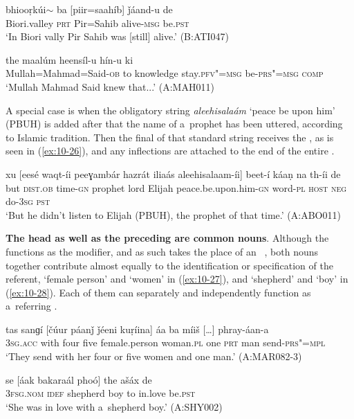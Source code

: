 \begin{exe}
\ex
\label{ex:10-24}
\gll bhiooṛkúi$\sim$ ba [piir=saahíb] ǰáand-u de \\
Biori.valley \textsc{prt} Pir=Sahib alive-\textsc{msg} be.\textsc{pst} \\
\glt `In Biori vally Pir Sahib was [still] alive.' (B:ATI047)

\ex
\label{ex:10-25}
\gll [mulaa=mhaamad=seed-á] the maalúm heensíl-u hín-u ki \\
Mullah=Mahmad=Said-\textsc{ob} to knowledge stay.\textsc{pfv"=msg} be-\textsc{prs"=msg} \textsc{comp} \\
\glt `Mullah Mahmad Said knew that...' (A:MAH011)
\end{exe}

A special case is when the obligatory string \textit{aleehisalaám} `peace be upon him' (PBUH) is added after that the name of a~prophet has been uttered, according to Islamic tradition. Then the final  of that standard string receives the , as is seen in (\ref{ex:10-26}), and any inflections are attached to the end of the entire .

\begin{exe}
\ex
\label{ex:10-26}
\gll xu [eesé waqt-íi peeɣambár hazrát iliaás aleehisalaam-íi] beet-í káaṇ na th-íi de \\
but \textsc{dist.ob} time-\textsc{gn} prophet lord  Elijah peace.be.upon.him-\textsc{gn} 
word-\textsc{pl} \textsc{host} \textsc{neg} do-\textsc{3sg} \textsc{pst} \\
\glt `But he didn't listen to Elijah (PBUH), the prophet of that time.' (A:ABO011)
\end{exe}

\textbf{The head as well as the preceding  are common nouns}. Although the  functions as the modifier, and as such takes the place of an~ , both nouns together contribute almost equally to the identification or specification of the referent, `female person' and `women' in (\ref{ex:10-27}), and `shepherd' and `boy' in (\ref{ex:10-28}). Each of them can separately and independently function as a~referring  . 

\begin{exe}
\ex
\label{ex:10-27}
\gll tas sanɡí [čúur páanǰ ǰéeni kuṛíina] áa ba míiš [{\ldots}] phray-áan-a \\
\textsc{3sg.acc} with four five female.person woman.\textsc{pl}  one \textsc{prt} man {} send-\textsc{prs"=mpl} \\
\glt `They send with her four or five women and one man.' (A:MAR082-3)

\ex
\label{ex:10-28}
\gll se [áak bakaraál phoó] the ašáx de  \\
\textsc{3fsg.nom} \textsc{idef} shepherd boy to in.love be.\textsc{pst}  \\
\glt `She was in love with a~shepherd boy.' (A:SHY002)
\end{exe}

